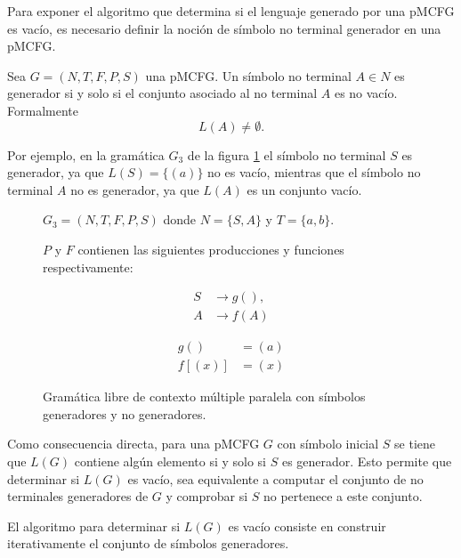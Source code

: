Para exponer el algoritmo que determina si el lenguaje generado por una pMCFG es vacío, es necesario definir la noción de símbolo no terminal generador en una pMCFG.

\begin{definition}
    Sea $G = (N, T, F, P, S)$ una pMCFG. Un símbolo no terminal $A \in N$ es generador si y solo si el conjunto asociado al no terminal $A$ es no vacío. Formalmente
    $$
        L(A) \neq \emptyset.
    $$
\end{definition}

Por ejemplo, en la gramática $G_3$ de la figura \ref{fig:pmcfg-example-3} el símbolo no terminal $S$ es generador, ya que $L(S) = \{(a)\}$ no es vacío, mientras que el símbolo no terminal $A$ no es generador, ya que $L(A)$ es un conjunto vacío.

\begin{figure}[h]
    \centering
    $G_3 = (N,T,F,P,S)$ donde $N = \{S,A\}$ y $T = \{a,b\}$.

    $P$ y $F$ contienen las siguientes producciones y funciones respectivamente:

    \begin{minipage}{0.45\textwidth}
        \begin{align*}
            S & \to g(), \\
            A & \to f(A)
        \end{align*}
    \end{minipage}
    \hfill
    \begin{minipage}{0.45\textwidth}
        \begin{align*}
            g()    & = (a) \\
            f[(x)] & = (x)
        \end{align*}
    \end{minipage}

    \caption{Gramática libre de contexto múltiple paralela con símbolos generadores y no generadores.}
    \label{fig:pmcfg-example-3}
\end{figure}


Como consecuencia directa, para una pMCFG $G$ con símbolo inicial $S$ se tiene que $L(G)$ contiene algún elemento si y solo si $S$  es generador. Esto permite que determinar si $L(G)$ es vacío, sea equivalente a computar el conjunto de no terminales generadores de $G$ y comprobar si $S$ no pertenece a este conjunto.

El algoritmo para determinar si $L(G)$ es vacío consiste en construir iterativamente el conjunto de símbolos generadores.

